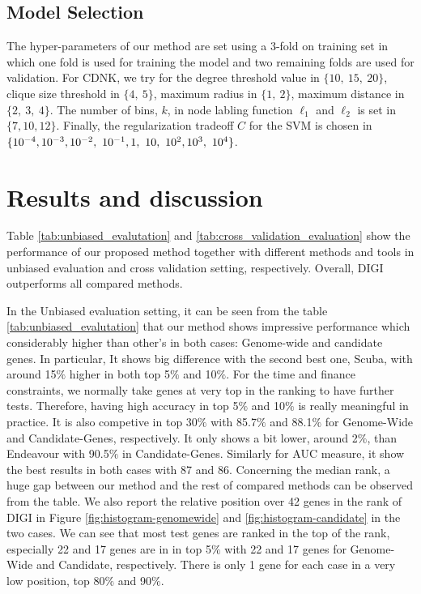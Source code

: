 \subsection*{Model Selection} The hyper-parameters of our method are set using a 3-fold on training set in which one fold is used for training the model and two remaining folds are used for validation. For CDNK, we try for the degree threshold value in $\lbrace 10,\ 15,\ 20 \rbrace$, clique size threshold in $\lbrace 4,\ 5 \rbrace$, maximum radius in $\lbrace 1,\ 2 \rbrace$, maximum distance in $\lbrace 2,\ 3,\ 4 \rbrace$. The number of bins, $k$, in node labling function $\ell_1$ and $\ell_2$ is set in $\lbrace 7, 10, 12 \rbrace$. Finally, the regularization tradeoff $C$ for the SVM is chosen in $\lbrace 10^{-4}, 10^{-3}, 10^{-2},\ 10^{-1}, 1,\ 10,\ 10^2, \\ 10^3,\ 10^4 \rbrace$.
\section{Results and discussion}
Table \ref{tab:unbiased_evalutation} and \ref{tab:cross_validation_evaluation} show the performance of our proposed method together with different methods and tools in unbiased evaluation and cross validation setting, respectively. Overall, DIGI outperforms all compared methods. 

In the Unbiased evaluation setting, it can be seen from the table \ref{tab:unbiased_evalutation} that our method shows impressive performance which considerably higher than other's in both cases: Genome-wide and candidate genes. In particular, It shows big difference with the second best one, Scuba, with around 15$\%$ higher in both top 5$\%$ and 10$\%$. For the time and finance constraints, we normally take genes at very top in the ranking to have further tests. Therefore, having high accuracy in top 5$\%$ and 10$\%$ is really meaningful in practice.
It is also competive in top 30$\%$ with 85.7$\%$ and 88.1$\%$ for Genome-Wide and Candidate-Genes, respectively. It only shows a bit lower, around 2$\%$, than Endeavour with 90.5$\%$ in Candidate-Genes. Similarly for AUC measure, it show the best results in both cases with 87 and 86. Concerning the median rank, a huge gap between our method and the rest of compared methods can be observed from the table. We also report the relative position over 42 genes in the rank of DIGI in Figure \ref{fig:histogram-genomewide} and \ref{fig:histogram-candidate} in the two cases.
We can see that most test genes are ranked in the top of the rank, especially 22 and 17 genes are in in top 5$\%$ with 22 and 17 genes for Genome-Wide and Candidate, respectively. There is only 1 gene for each case in a very low position, top 80$\%$ and 90$\%$.


